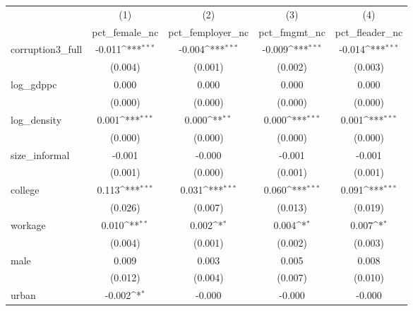 {
\def\sym#1{\ifmmode^{#1}\else\(^{#1}\)\fi}
\begin{tabular}{l*{4}{c}}
\hline\hline
            &\multicolumn{1}{c}{(1)}&\multicolumn{1}{c}{(2)}&\multicolumn{1}{c}{(3)}&\multicolumn{1}{c}{(4)}\\
            &\multicolumn{1}{c}{pct\_female\_nc}&\multicolumn{1}{c}{pct\_femployer\_nc}&\multicolumn{1}{c}{pct\_fmgmt\_nc}&\multicolumn{1}{c}{pct\_fleader\_nc}\\
\hline
corruption3\_full&      -0.011\sym{***}&      -0.004\sym{***}&      -0.009\sym{***}&      -0.014\sym{***}\\
            &     (0.004)         &     (0.001)         &     (0.002)         &     (0.003)         \\
[1em]
log\_gdppc   &       0.000         &       0.000         &       0.000         &       0.000         \\
            &     (0.000)         &     (0.000)         &     (0.000)         &     (0.000)         \\
[1em]
log\_density &       0.001\sym{***}&       0.000\sym{**} &       0.000\sym{***}&       0.001\sym{***}\\
            &     (0.000)         &     (0.000)         &     (0.000)         &     (0.000)         \\
[1em]
size\_informal&      -0.001         &      -0.000         &      -0.001         &      -0.001         \\
            &     (0.001)         &     (0.000)         &     (0.001)         &     (0.001)         \\
[1em]
college     &       0.113\sym{***}&       0.031\sym{***}&       0.060\sym{***}&       0.091\sym{***}\\
            &     (0.026)         &     (0.007)         &     (0.013)         &     (0.019)         \\
[1em]
workage     &       0.010\sym{**} &       0.002\sym{*}  &       0.004\sym{*}  &       0.007\sym{*}  \\
            &     (0.004)         &     (0.001)         &     (0.002)         &     (0.003)         \\
[1em]
male        &       0.009         &       0.003         &       0.005         &       0.008         \\
            &     (0.012)         &     (0.004)         &     (0.007)         &     (0.010)         \\
[1em]
urban       &      -0.002\sym{*}  &      -0.000         &      -0.000         &      -0.000         \\

\end{tabular}}
